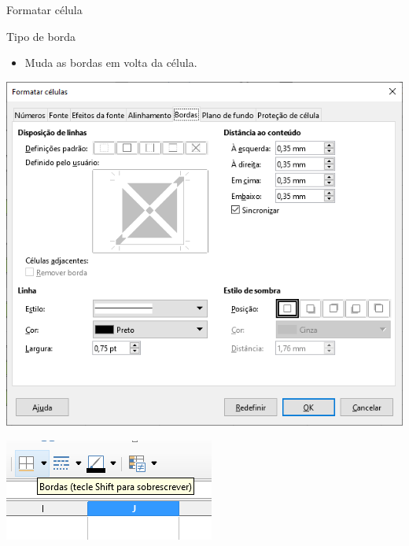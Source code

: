 \begin{frame}{Formatar célula}
	\begin{block}{Tipo de borda}
		\begin{itemize}
			\item Muda as bordas em volta da célula.
		\end{itemize}
	\end{block}
	
	\begin{minipage}{0.49\linewidth}
		\centering
		\includegraphics[width=1\linewidth]{Figuras/Ch06/fig34}
	\end{minipage}\hfill
	\begin{minipage}{0.49\linewidth}
		\centering
		\includegraphics[width=1\linewidth]{Figuras/Ch06/fig35}
	\end{minipage}
\end{frame}


